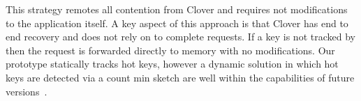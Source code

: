 This strategy remotes all contention from Clover and
requires not modifications to the application itself. A key
aspect of this approach is that Clover has end to end
recovery and does not rely on \sword to complete requests.
If a key is not tracked by \sword then the request is
forwarded directly to memory with no modifications. Our
prototype statically tracks hot keys, however a dynamic
solution in which hot keys are detected via a count min
sketch are well within the capabilities of future
versions~\cite{switchml}.